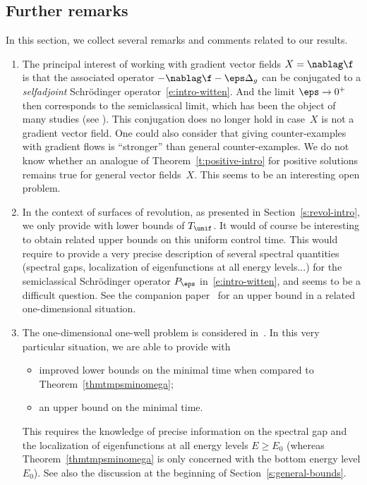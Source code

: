 \subsection{Further remarks}
In this section, we collect several remarks and comments related to our results.
\begin{enumerate}
\item The principal interest of working with gradient vector fields $X=\nablag\f$ is that the associated operator $-\nablag\f-\eps\Delta_g$ can be conjugated to a {\em selfadjoint} Schrödinger operator~\eqref{e:intro-witten}.
And the limit $\eps\to 0^+$ then corresponds to the semiclassical limit, which has been the object of many studies (see \eg \cite{Witten:82,Simon:83,HS84,HS:85,Helffer:booksemiclassic,CFKS,Allibert:98,HKN:04,HN:06}).
This conjugation does no longer hold in case~$X$ is not a gradient vector field.
One could also consider that giving counter-examples with gradient flows is ``stronger'' than general counter-examples.
We do not know whether an analogue of Theorem~\ref{t:positive-intro} for positive solutions remains true for general vector fields~$X$. This seems to be an interesting open problem.

\item In the context of surfaces of revolution, as presented in Section~\ref{s:revol-intro}, we only provide with lower bounds of $T_{\unif}$. It would of course be interesting to obtain related upper bounds on this uniform control time. This would require to provide a very precise description of several spectral quantities (spectral gaps, localization of eigenfunctions at all energy levels...) for the semiclassical Schrödinger operator $P_\eps$ in~\eqref{e:intro-witten}, and seems to be a difficult question.
See the companion paper~\cite{LL:20-1D} for an upper bound in a related one-dimensional situation.

\item The one-dimensional one-well problem is considered in~\cite{LL:20-1D}. In this very particular situation, we are able to provide with
\begin{itemize}
\item improved lower bounds on the minimal time when compared to Theorem~\ref{thmtmpsminomega};
\item an upper bound on the minimal time.
\end{itemize}
This requires the knowledge of precise information on the spectral gap and the localization of eigenfunctions at all energy levels $E\geq E_0$ (whereas Theorem~\ref{thmtmpsminomega} is only concerned with the bottom energy level $E_0$). See also the discussion at the beginning of Section~\ref{s:general-bounds}.


\end{enumerate}
